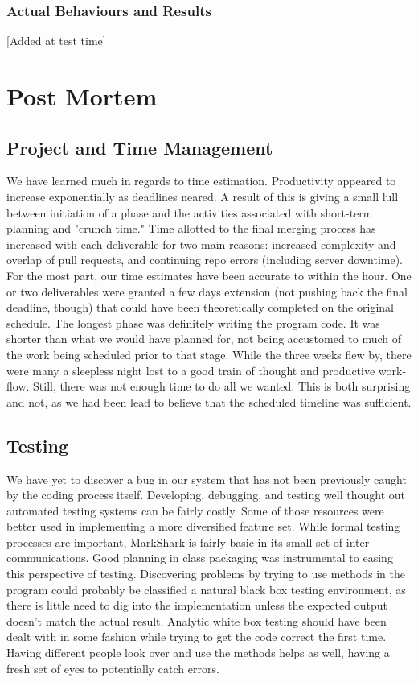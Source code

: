 \documentclass{article}
\begin{document}
\subsubsection{Actual Behaviours and Results}
[Added at test time]

\section{Post Mortem}
\subsection{Project and Time Management}
We have learned much in regards to time estimation.  Productivity appeared to increase exponentially as deadlines neared.  A result of this is giving a small lull between initiation of a phase and the activities associated with short-term planning and "crunch time."  Time allotted to the final merging process has increased with each deliverable for two main reasons: increased complexity and overlap of pull requests, and continuing repo errors (including server downtime).
For the most part, our time estimates have been accurate to within the hour.  One or two deliverables were granted a few days extension (not pushing back the final deadline, though) that could have been theoretically completed on the original schedule.  The longest phase was definitely writing the program code.  It was shorter than what we would have planned for, not being accustomed to much of the work being scheduled prior to that stage.  While the three weeks flew by, there were many a sleepless night lost to a good train of thought and productive work-flow.  Still, there was not enough time to do all we wanted.  This is both surprising and not, as we had been lead to believe that the scheduled timeline was sufficient.

\subsection{Testing}
We have yet to discover a bug in our system that has not been previously caught by the coding process itself.  Developing, debugging, and testing well thought out automated testing systems can be fairly costly.  Some of those resources were better used in implementing a more diversified feature set.  While formal testing processes are important, MarkShark is fairly basic in its small set of inter-communications.  Good planning in class packaging was instrumental to easing this perspective of testing.  Discovering problems by trying to use methods in the program could probably  be classified a natural black box testing environment, as there is little need to dig into the implementation unless the expected output doesn't match the actual result.  Analytic white box testing should have been dealt with in some fashion while trying to get the code correct the first time.  Having different people look over and use the methods helps as well, having a fresh set of eyes to potentially catch errors.  
\end{document}
